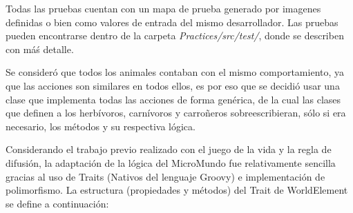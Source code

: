     Todas las pruebas cuentan con un mapa de prueba generado por imagenes definidas o bien como valores de entrada del mismo desarrollador. Las pruebas pueden encontrarse dentro de la carpeta \textit{Practices/src/test/}, donde se describen con máś detalle.

    Se consideró que todos los animales contaban con el mismo comportamiento, ya que las acciones son similares en todos ellos, es por eso que se decidió usar una clase que implementa todas las acciones de forma genérica, de la cual las clases que definen a los herbívoros, carnívoros y carroñeros sobreescribieran, sólo si era necesario, los métodos y su respectiva lógica.

    Considerando el trabajo previo realizado con el juego de la vida y la regla de difusión, la adaptación de la lógica del MicroMundo fue relativamente sencilla gracias al uso de Traits (Nativos del lenguaje Groovy) e implementación de polimorfismo. La estructura (propiedades y métodos) del Trait de WorldElement se define a continuación:

